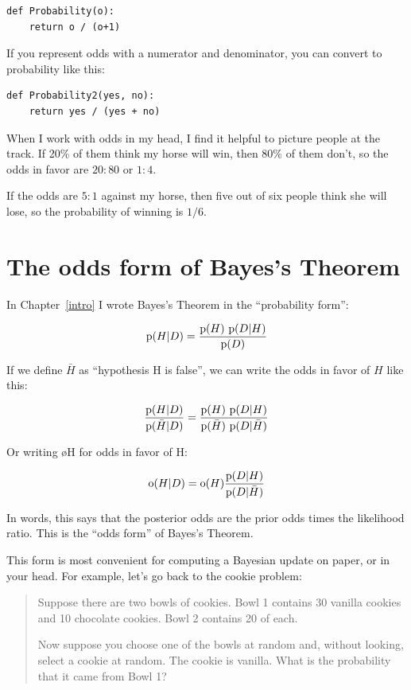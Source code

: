 \documentclass[12pt]{book}
\begin{document}
\begin{verbatim}
def Probability(o):
    return o / (o+1)
\end{verbatim}

If you represent odds with a numerator and denominator, you
can convert to probability like this:

\begin{verbatim}
def Probability2(yes, no):
    return yes / (yes + no)
\end{verbatim}

When I work with odds in my head, I find it helpful to picture
people at the track.  If 20\% of them think my horse will win,
then 80\% of them don't, so the odds in favor are $20:80$ or
$1:4$.

If the odds are $5:1$ against my horse, then five out of six
people think she will lose, so the probability of winning
is $1/6$.

\section{The odds form of Bayes's Theorem}

In Chapter~\ref{intro} I wrote Bayes's Theorem in the ``probability
form'':

\[ \mathrm{p}(H|D) = \frac{\mathrm{p}(H)~\mathrm{p}(D|H)}{\mathrm{p}(D)} \]

If we define $\bar{H}$ as ``hypothesis H is false'', we can write the
odds in favor of $H$ like this:

\[ \frac{\mathrm{p}(H|D)}{\mathrm{p}(\bar{H}|D)} = \frac{\mathrm{p}(H)~\mathrm{p}(D|H)}
                                        {\mathrm{p}(\bar{H})~\mathrm{p}(D|\bar{H})} \]

Or writing \o{H} for odds in favor of H:

\[ \mathrm{o}(H|D) = \mathrm{o}(H) \frac{\mathrm{p}(D|H)}{\mathrm{p}(D|\bar{H})} \]

In words, this says that the posterior odds are the prior odds times
the likelihood ratio.  This is the ``odds form'' of Bayes's Theorem.

This form is most convenient for computing a Bayesian update on
paper, or in your head.  For example, let's go back to the
cookie problem:

\begin{quote}
Suppose there are two bowls of cookies.  Bowl 1 contains
  30 vanilla cookies and 10 chocolate cookies.  Bowl 2 contains 20 of
  each.

Now suppose you choose one of the bowls at random and, without looking,
select a cookie at random.  The cookie is vanilla.  What is the probability
that it came from Bowl 1?
\end{quote}
\end{document}

